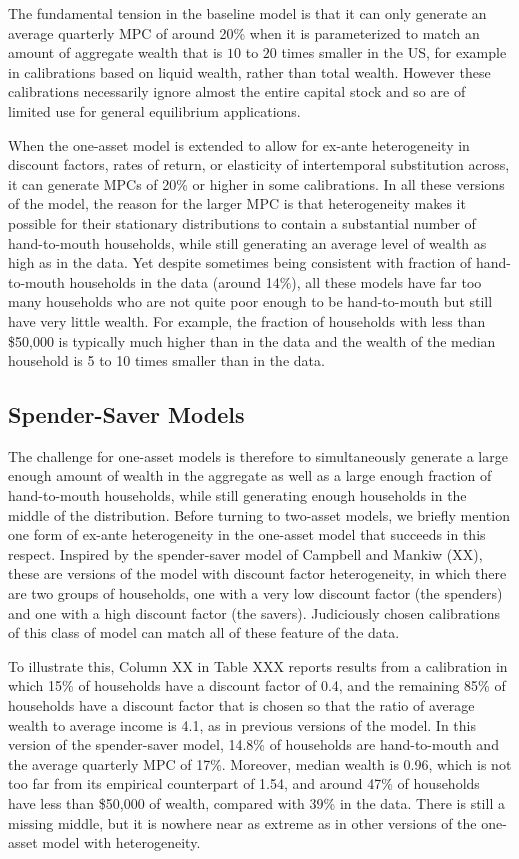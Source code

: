 The fundamental tension in the baseline model is that it can only generate an average quarterly MPC of around 20\% when it is parameterized to match an amount of aggregate wealth that is $10$ to $20$ times smaller in the US, for example in calibrations based on liquid wealth, rather than total wealth. However these calibrations necessarily ignore almost the entire capital stock and so are of limited use for general equilibrium applications.

When the one-asset model is extended to allow for ex-ante heterogeneity in discount factors, rates of return, or elasticity of intertemporal substitution across, it can generate MPCs of 20\% or higher  in some calibrations. In all these versions of the model, the reason for the larger MPC is that  heterogeneity makes it possible for their stationary distributions to contain a substantial number of hand-to-mouth households, while still generating an average level of wealth as high as in the data. Yet despite sometimes being consistent with fraction of hand-to-mouth households in the data (around 14\%), all these models have far too many households who are not quite poor enough to be hand-to-mouth but still have very little wealth. For example, the fraction of households with less than \$50,000 is typically much higher than in the data and the wealth of the median household is 5 to 10 times smaller than in the data.

\subsection{Spender-Saver Models}

The challenge for one-asset models is therefore to simultaneously generate a large enough amount of wealth in the aggregate as well as a large enough fraction of hand-to-mouth households, while still generating enough households in the middle of the distribution. Before turning to two-asset models, we briefly mention one form of ex-ante heterogeneity in the one-asset model that succeeds in this respect. Inspired by the spender-saver model of Campbell and Mankiw (XX), these are versions of the model with discount factor heterogeneity, in which there are two groups of households, one with a very low discount factor (the spenders) and one with a high discount factor (the savers). Judiciously chosen calibrations of this class of model can match all of these feature of the data.

To illustrate this, Column XX in Table XXX reports results from a calibration in which 15\% of households have a discount factor of 0.4, and the remaining 85\% of households have a discount factor that is chosen so that the ratio of average wealth to average income is 4.1, as in previous versions of the model. In this version of the spender-saver model, 14.8\% of households are hand-to-mouth and the average quarterly MPC of 17\%. Moreover, median wealth is 0.96, which is not too far from its empirical counterpart of 1.54, and around 47\% of households have less than \$50,000 of wealth,  compared with 39\% in the data. There is still a missing middle, but it is nowhere near as extreme as in other versions of the one-asset model with heterogeneity.


